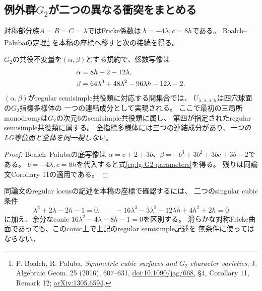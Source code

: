 \subsection{例外群\texorpdfstring{$G_2$}{G2}が二つの異なる衝突をまとめる}
対称部分族$A=B=C=\lambda$ではFricke係数は
$b=-4\lambda,c=8h$である。
Boalch--Palubaの定理\footnote{
P. Boalch, R. Paluba, \emph{Symmetric cubic surfaces and $G_2$ character varieties},
J. Algebraic Geom. 25 (2016), 607--631,
\href{https://doi.org/10.1090/jag/668}{doi:10.1090/jag/668},
\S4, Corollary 11, Remark 12;
\href{https://arxiv.org/abs/1305.6594}{arXiv:1305.6594}.}
を本稿の座標へ移すと次の接続を得る。

\begin{proposition}
\label{prop:lg-G2-realization}
$G_2$の共役不変量を$(\alpha,\beta)$とする規約で、係数写像は
\begin{align}\label{eq:lg-G2-parameters}
 \alpha&=8h+2-12\lambda,\notag\\
 \beta&=64\lambda^3+48\lambda^2-96\lambda h-12\lambda-2.
\end{align}
$(\alpha,\beta)$がregular semisimple共役類に対応する開集合では、
$U_{\lambda,\lambda,\lambda;h}$は四穴球面の$G_2$指標多様体の
一つの連結成分として実現される。
ここで最初の三局所monodromyは$G_2$の次元6のsemisimple共役類に属し、
第四が指定されたregular semisimple共役類に属する。
全指標多様体には三つの連結成分があり、\emph{一つのLG等位面と全体を同一視しない}。
\end{proposition}
\begin{proof}
Boalch--Palubaの底写像は
$\alpha=c+2+3b$、$\beta=-b^3+3b^2+3bc+3b-2$である。
$b=-4\lambda,c=8h$を代入すると式\eqref{eq:lg-G2-parameters}を得る。
残りは同論文Corollary 11の適用である。
\end{proof}

同論文のregular locusの記述を本稿の座標で確認するには、
二つのsingular cubic条件
\[
 \lambda^2+2\lambda-2h-1=0,\qquad
 -16\lambda^3-3\lambda^2+12\lambda h+4h^2+2h=0
\]
に加え、余分なconic $16\lambda^2-4\lambda-8h-1=0$を区別する。
滑らかな対称Fricke曲面であっても、このconic上で上記のregular semisimple記述を
無条件に使ってはならない。

